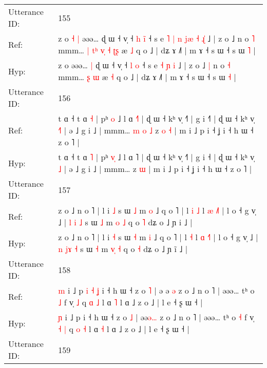 \documentclass[10pt]{article}
\DeclareRobustCommand{\hl}[1]{{\textcolor{red}{#1}}}
\begin{document}
\begin{longtable}{ll}
 \\
\midrule
Utterance ID: & 155 \\
Ref: & z o\hl{ }\hl{˧}\hl{ }\hl{|} əəə…\hl{}\hl{} ɖ ɯ ˧ v̩ ˧ \hl{h} \hl{i}\hl{̃} ˧ s e\hl{ }\hl{˥}\hl{ }\hl{|}\hl{ }\hl{n} \hl{j}\hl{æ} \hl{˧} \hl{ɻ}\hl{̍} ˩ | z o ˩\hl{}\hl{} n o \hl{˥} mmm…\hl{ }\hl{|}\hl{ }\hl{t}\hl{ʰ}\hl{ }\hl{v}\hl{̩} \hl{˧} \hl{ʈ}\hl{ʂ} æ \hl{˩} q o ˩ | dʑ ɤ ˩˥ | m ɤ ˧ s ɯ ˧ s ɯ \hl{˥} |
 \\
Hyp: & z o\hl{}\hl{}\hl{}\hl{} əəə…\hl{ }\hl{|} ɖ ɯ ˧ v̩ ˧ \hl{l} \hl{}\hl{o} ˧ s e\hl{}\hl{}\hl{}\hl{}\hl{}\hl{} \hl{}\hl{˧} \hl{ɲ} \hl{}\hl{i} ˩ | z o ˩\hl{ }\hl{|} n o \hl{˧} mmm…\hl{}\hl{}\hl{}\hl{}\hl{}\hl{}\hl{}\hl{} \hl{ʂ} \hl{}\hl{ɯ} æ \hl{˧} q o ˩ | dʑ ɤ ˩˥ | m ɤ ˧ s ɯ ˧ s ɯ \hl{˧} |
 \\
\midrule
Utterance ID: & 156 \\
Ref: & t ɑ ˧ t ɑ \hl{˧} | pʰ \hl{}\hl{o} ˩ l ɑ \hl{˧}˥ | ɖ ɯ ˧ kʰ v̩ ˧˥ | g i ˧\hl{˥} | ɖ ɯ ˧ kʰ v̩ \hl{˧}\hl{˥} | ə ˩ g i ˩ | mmm…\hl{ }\hl{m}\hl{ }\hl{o}\hl{ }\hl{˩} z\hl{ }\hl{o} \hl{˧} | m i ˩ p i ˧ ʝ i ˧ h ɯ ˧ z o ˥ |
 \\
Hyp: & t ɑ ˧ t ɑ \hl{˥} | pʰ \hl{v}\hl{̩} ˩ l ɑ \hl{}˥ | ɖ ɯ ˧ kʰ v̩ ˧˥ | g i ˧\hl{} | ɖ ɯ ˧ kʰ v̩ \hl{}\hl{˩} | ə ˩ g i ˩ | mmm…\hl{}\hl{}\hl{}\hl{}\hl{}\hl{} z\hl{}\hl{} \hl{ɯ} | m i ˩ p i ˧ ʝ i ˧ h ɯ ˧ z o ˥ |
 \\
\midrule
Utterance ID: & 157 \\
Ref: & z o ˩ n o ˥ | l i \hl{˩} s ɯ \hl{˩} m \hl{o} ˩ q o ˥ | l\hl{ }\hl{i} \hl{˩} l \hl{æ} \hl{˩}˥ | l o ˧ g v̩ ˩ | \hl{l} \hl{}\hl{i} \hl{˩} s ɯ \hl{˩} m \hl{}\hl{o} \hl{˩} q o \hl{˥} dʑ o ˩ ɲ i\hl{} ˩ |
 \\
Hyp: & z o ˩ n o ˥ | l i \hl{˧} s ɯ \hl{˧} m \hl{i} ˩ q o ˥ | l\hl{}\hl{} \hl{˧} l \hl{ɑ} \hl{˧}˥ | l o ˧ g v̩ ˩ | \hl{n} \hl{j}\hl{ɤ} \hl{˧} s ɯ \hl{˧} m \hl{v}\hl{̩} \hl{˧} q o \hl{˧} dʑ o ˩ ɲ i\hl{̃} ˩ |
 \\
\midrule
Utterance ID: & 158 \\
Ref: & \hl{m} i ˩ p\hl{ }\hl{i}\hl{ }\hl{˧}\hl{ }\hl{ʝ} i ˧ h ɯ ˧ z o \hl{˥} | ə\hl{ }ə\hl{ }\hl{ə} z o ˩ n o ˥ | əəə… tʰ o \hl{˩} f v̩\hl{}\hl{} \hl{˩} q \hl{ɑ} \hl{˩} l ɑ \hl{˥} l ɑ ˩ z o ˩ | l e ˧ ʂ ɯ ˧ |
 \\
Hyp: & \hl{ɲ} i ˩ p\hl{}\hl{}\hl{}\hl{}\hl{}\hl{} i ˧ h ɯ ˧ z o \hl{˩} | ə\hl{}ə\hl{ə}\hl{…} z o ˩ n o ˥ | əəə… tʰ o \hl{˧} f v̩\hl{ }\hl{˧} \hl{|} q \hl{o} \hl{˧} l ɑ \hl{˧} l ɑ ˩ z o ˩ | l e ˧ ʂ ɯ ˧ |
 \\
\midrule
Utterance ID: & 159 \\

\end{longtable}
\end{document}
